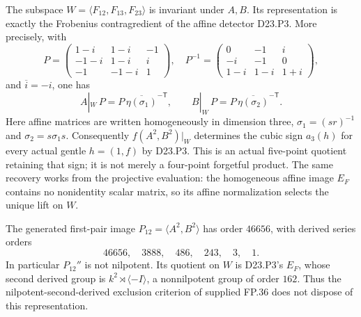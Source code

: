 The subspace $W=\langle F_{12},F_{13},F_{23}\rangle$ is
invariant under $A,B$. Its representation is exactly the Frobenius
contragredient of the affine detector D23.P3. More precisely, with
\[
P=\begin{pmatrix}
1-i&1-i&-1\\
-1-i&1-i&i\\
-1&-1-i&1
\end{pmatrix},
\quad
P^{-1}=\begin{pmatrix}
0&-1&i\\
-i&-1&0\\
1-i&1-i&1+i
\end{pmatrix},
\tag{D23.P6.2}
\]
and $\overline{i}=-i$, one has
\[
 A|_W\,P=P\,\overline{\eta(\sigma_1)}^{-\mathsf T},\qquad
 B|_W\,P=P\,\overline{\eta(\sigma_2)}^{-\mathsf T}.
\tag{D23.P6.3}
\]
Here affine matrices are written homogeneously in dimension three,
$\sigma_1=(sr)^{-1}$ and $\sigma_2=s\sigma_1s$.
Consequently $f(A^2,B^2)|_W$ determines the cubic sign $a_3(h)$
for every actual gentle $h=(1,f)$ by D23.P3. This is an actual
five-point quotient retaining that sign; it is not merely a
four-point forgetful product.
The same recovery works from the projective evaluation: the
homogeneous affine image $E_F$ contains no nonidentity scalar
matrix, so its affine normalization selects the unique lift on $W$.

The generated first-pair image
$P_{12}=\langle A^2,B^2\rangle$ has order $46656$, with derived
series orders
\[
46656,\quad3888,\quad486,\quad243,\quad3,\quad1.
\tag{D23.P6.4}
\]
In particular $P_{12}''$ is not nilpotent. Its quotient on $W$
is D23.P3's $E_F$, whose second derived group is
$k^2\rtimes\langle-I\rangle$, a nonnilpotent group of order $162$.
Thus the nilpotent-second-derived exclusion criterion of supplied
FP.36 does not dispose of this representation.

